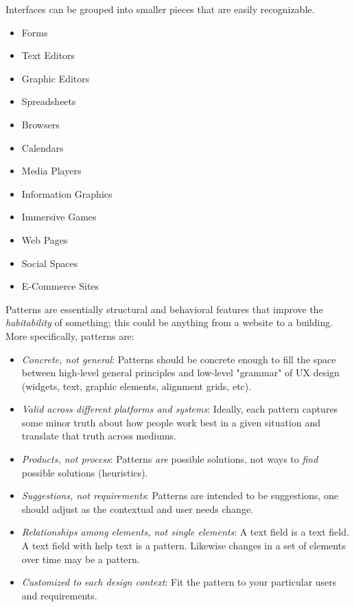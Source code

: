 
Interfaces can be grouped into smaller pieces that are easily recognizable.
\begin{itemize}
\item Forms
\item Text Editors
\item Graphic Editors
\item Spreadsheets
\item Browsers
\item Calendars
\item Media Players
\item Information Graphics
\item Immersive Games
\item Web Pages
\item Social Spaces
\item E-Commerce Sites
\end{itemize}

Patterns are essentially structural and behavioral features that improve the \emph{habitability} of something; this could be anything from a website to a building. More specifically, patterns are:
\begin{itemize}
\item \emph{Concrete, not general}: Patterns should be concrete enough to fill the space between high-level general principles and low-level "grammar" of UX design (widgets, text, graphic elements, alignment grids, etc).

\item \emph{Valid across different platforms and systems}: Ideally, each pattern captures some minor truth about how people work best in a given situation and translate that truth across mediums.

\item \emph{Products, not process}: Patterns \emph{are} possible solutions, not ways to \emph{find} possible solutions (heuristics).

\item \emph{Suggestions, not requirements}: Patterns are intended to be suggestions, one should adjust as the contextual and user needs change.

\item \emph{Relationships among elements, not single elements}: A text field is a text field. A text field with help text is a pattern. Likewise changes in a set of elements over time may be a pattern.

\item \emph{Customized to each design context}: Fit the pattern to your particular users and requirements.
\end{itemize}

